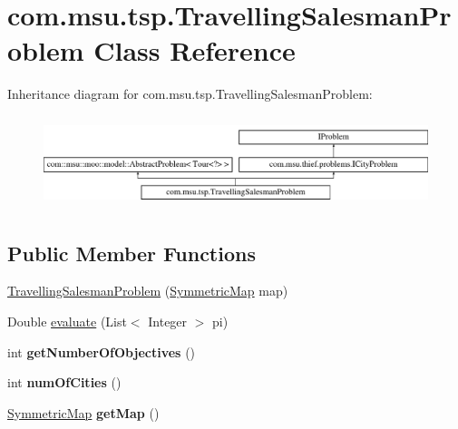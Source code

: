 \hypertarget{classcom_1_1msu_1_1tsp_1_1TravellingSalesmanProblem}{\section{com.\-msu.\-tsp.\-Travelling\-Salesman\-Problem Class Reference}
\label{classcom_1_1msu_1_1tsp_1_1TravellingSalesmanProblem}
}
Inheritance diagram for com.\-msu.\-tsp.\-Travelling\-Salesman\-Problem\-:\begin{figure}[H]
\begin{center}
\leavevmode
\includegraphics[height=2.718446cm]{classcom_1_1msu_1_1tsp_1_1TravellingSalesmanProblem}
\end{center}
\end{figure}
\subsection*{Public Member Functions}
\begin{DoxyCompactItemize}
\item 
\hyperlink{classcom_1_1msu_1_1tsp_1_1TravellingSalesmanProblem_a0a5878269d3ef19bcae96cefd7780203}{Travelling\-Salesman\-Problem} (\hyperlink{classcom_1_1msu_1_1thief_1_1model_1_1SymmetricMap}{Symmetric\-Map} map)
\item 
Double \hyperlink{classcom_1_1msu_1_1tsp_1_1TravellingSalesmanProblem_a798e3f5291752f96cdad115704e18d7a}{evaluate} (List$<$ Integer $>$ pi)
\item 
\hypertarget{classcom_1_1msu_1_1tsp_1_1TravellingSalesmanProblem_a579ec22ec3327c72aaf05e2b4649af3f}{int {\bfseries get\-Number\-Of\-Objectives} ()}\label{classcom_1_1msu_1_1tsp_1_1TravellingSalesmanProblem_a579ec22ec3327c72aaf05e2b4649af3f}

\item 
\hypertarget{classcom_1_1msu_1_1tsp_1_1TravellingSalesmanProblem_a07ba09f7b9170509441f9d2926158f51}{int {\bfseries num\-Of\-Cities} ()}\label{classcom_1_1msu_1_1tsp_1_1TravellingSalesmanProblem_a07ba09f7b9170509441f9d2926158f51}

\item 
\hypertarget{classcom_1_1msu_1_1tsp_1_1TravellingSalesmanProblem_a10b90d40349c85a3f648158e9fa5a523}{\hyperlink{classcom_1_1msu_1_1thief_1_1model_1_1SymmetricMap}{Symmetric\-Map} {\bfseries get\-Map} ()}\label{classcom_1_1msu_1_1tsp_1_1TravellingSalesmanProblem_a10b90d40349c85a3f648158e9fa5a523}

\end{DoxyCompactItemize}
